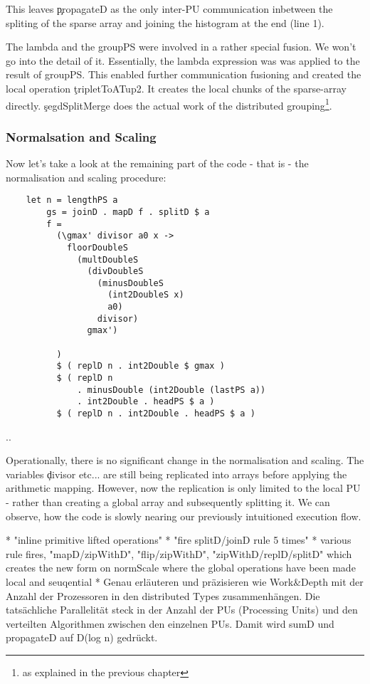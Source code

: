         This leaves \c{propagateD} as the only inter-PU communication inbetween the spliting of the
        sparse array and joining the histogram at the end (line 1).
        
        The lambda and the groupPS were involved in a rather special fusion. We won't
        go into the detail of it. Essentially, the lambda expression was
        was applied to the result of groupPS. This enabled further communication
        fusioning and created the local operation \c{tripletToATup2}. It creates the
        local chunks of the sparse-array directly. \c{segdSplitMerge} does the
        actual work of the distributed grouping\footnote[2]{as explained in the previous chapter}.
        
      \subsubsection{Normalsation and Scaling}
      
      Now let's take a look at the remaining part of the code - that is - the
      normalisation and scaling procedure:
      
      \begin{lstlisting}
    let n = lengthPS a
        gs = joinD . mapD f . splitD $ a
        f =
          (\gmax' divisor a0 x ->
            floorDoubleS
              (multDoubleS
                (divDoubleS
                  (minusDoubleS
                    (int2DoubleS x)
                    a0)
                  divisor)
                gmax')
            
          )
          $ ( replD n . int2Double $ gmax )
          $ ( replD n
              . minusDouble (int2Double (lastPS a))
              . int2Double . headPS $ a )
          $ ( replD n . int2Double . headPS $ a )
      \end{lstlisting}
      
      ..
      
      
      Operationally, there is no significant change in the normalisation and scaling.
      The variables \c{divisor} etc... are still being replicated into arrays
      before applying the arithmetic mapping. However, now the replication
      is only limited to the local PU - rather than creating a global array and
      subsequently splitting it. We can observe, how the code is slowly nearing
      our previously intuitioned execution flow.
      
      * "inline primitive lifted operations"
      * "fire splitD/joinD rule 5 times"
      * various rule fires, "mapD/zipWithD", "flip/zipWithD", "zipWithD/replD/splitD"
        which creates the new form on normScale where the global operations have been made local and seuqential
      * Genau erläuteren und präzisieren wie Work&Depth mit der Anzahl der Prozessoren in den distributed Types zusammenhängen.
          Die tatsächliche Parallelität steck in der Anzahl der PUs (Processing Units) und den verteilten Algorithmen
          zwischen den einzelnen PUs. Damit wird sumD und propagateD auf D(log n) gedrückt.
          
